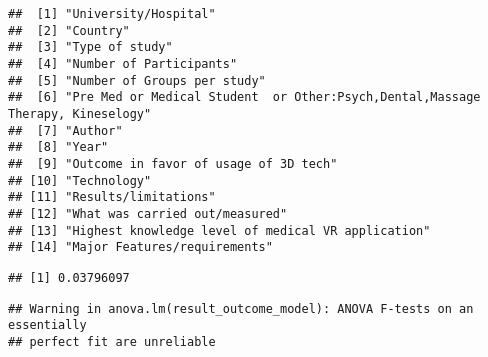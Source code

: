 \documentclass[]{article}
\newenvironment{Shaded}{\begin{snugshade}}{\end{snugshade}}
\newcommand{\DataTypeTok}[1]{\textcolor[rgb]{0.13,0.29,0.53}{#1}}
\newcommand{\KeywordTok}[1]{\textcolor[rgb]{0.13,0.29,0.53}{\textbf{#1}}}
\newcommand{\NormalTok}[1]{#1}
\newcommand{\OperatorTok}[1]{\textcolor[rgb]{0.81,0.36,0.00}{\textbf{#1}}}
\newcommand{\StringTok}[1]{\textcolor[rgb]{0.31,0.60,0.02}{#1}}
\begin{document}
\begin{verbatim}
##  [1] "University/Hospital"                                                          
##  [2] "Country"                                                                      
##  [3] "Type of study"                                                                
##  [4] "Number of Participants"                                                       
##  [5] "Number of Groups per study"                                                   
##  [6] "Pre Med or Medical Student  or Other:Psych,Dental,Massage Therapy, Kineselogy"
##  [7] "Author"                                                                       
##  [8] "Year"                                                                         
##  [9] "Outcome in favor of usage of 3D tech"                                         
## [10] "Technology"                                                                   
## [11] "Results/limitations"                                                          
## [12] "What was carried out/measured"                                                
## [13] "Highest knowledge level of medical VR application"                            
## [14] "Major Features/requirements"
\end{verbatim}

\begin{Shaded}
\end{Shaded}

\begin{verbatim}
## [1] 0.03796097
\end{verbatim}

\begin{Shaded}
\end{Shaded}

\begin{verbatim}
## Warning in anova.lm(result_outcome_model): ANOVA F-tests on an essentially
## perfect fit are unreliable
\end{verbatim}
\end{document}
